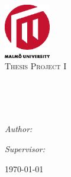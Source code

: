 \begin{titlepage}
\begin{center}

\includegraphics[width=0.15\textwidth]{./img/mah2.eps}~\\[1cm]


\textsc{\Large Thesis Project I}\\[0.5cm]

\HRule \\[0.4cm]
{ \huge \bfseries \titel \\[0.4cm] }

\HRule \\[1.5cm]

\begin{minipage}{0.4\textwidth}
\begin{flushleft} \large
\emph{Author:}\\
\autor
\end{flushleft}
\end{minipage}
\begin{minipage}{0.4\textwidth}
\begin{flushright} \large
\emph{Supervisor:} \\
\supervisor
\end{flushright}
\end{minipage}

\vfill

{\large \today}

\end{center}
\end{titlepage}
